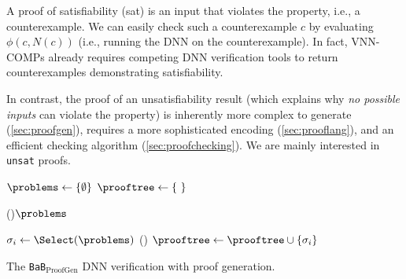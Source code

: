 \documentclass[oneside,11pt,dvipsnames]{book}
\numberwithin{equation}{section}
\theoremstyle{definition}
\theoremstyle{remark}
\newcommand{\proofgen}{\texttt{BaB$_{\text{ProofGen}}$}}
\begin{document}
A proof of satisfiability (sat) is an input that violates the property, i.e., a counterexample.  We can easily  check such a counterexample $c$ by evaluating $\phi(c,N(c))$ (i.e., running the DNN on the counterexample).
In fact, VNN-COMPs already requires competing DNN verification tools to return counterexamples demonstrating satisfiability.  

In contrast, the proof of an unsatisfiability result (which explains why \emph{no possible inputs} can violate the property) is inherently more complex to generate (\autoref{sec:proofgen}), requires a more sophisticated encoding (\autoref{sec:prooflang}), and an efficient checking algorithm (\autoref{sec:proofchecking}). We are mainly interested in \texttt{unsat} proofs.


\begin{algorithm}[t]
    \footnotesize
  
    \BlankLine


    $\problems \leftarrow \{ \emptyset \}$ \label{line:activation} 
    $\prooftree \gets \{ ~ \}$ \label{line:prooftree}
    
    \While(){$\problems$}{\label{line:dpllstart}
        $\sigma_i \gets \Select(\problems)$ 
            \Else(){
                $\prooftree \leftarrow \prooftree \cup \{ \sigma_i \}$  \label{line:record_proof}
            }
        
    }\label{line:dpllend}
    \Return{$(\unsat, \prooftree)$}
    
    \caption{The \proofgen{} DNN verification with proof generation.}\label{alg:bab-proof}
\end{algorithm}
\end{document}

